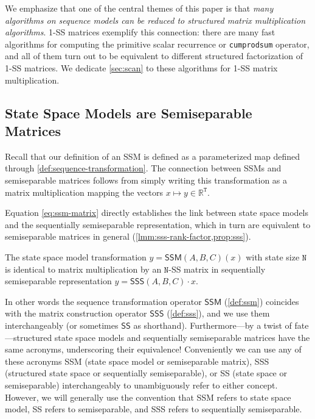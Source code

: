 We emphasize that one of the central themes of this paper is that \emph{many algorithms on sequence models can be reduced to structured matrix multiplication algorithms}. 1-SS matrices exemplify this connection: there are many fast algorithms for computing the primitive scalar recurrence or \texttt{cumprodsum} operator, and all of them turn out to be equivalent to different structured factorization of 1-SS matrices. We dedicate \ref{sec:scan} to these algorithms for 1-SS matrix multiplication.

\subsection{State Space Models are Semiseparable Matrices} Recall that our definition of an SSM is defined as a parameterized map defined through \ref{def:sequence-transformation}.
The connection between SSMs and semiseparable matrices follows from simply writing this transformation as a matrix multiplication mapping the vectors $x \mapsto y \in \mathbb{R}^\mathtt{T}$.

Equation \eqref{eq:ssm-matrix} directly establishes the link between state space models and the sequentially semiseparable representation, which in turn are equivalent to semiseparable matrices in general (\ref{lmm:sss-rank-factor,prop:sss}).

\begin{theorem}
  \label{thm:ssm-sss}
  The state space model transformation $y = \mathsf{SSM}(A, B, C)(x)$ with state size $\mathtt{N}$ is identical to matrix multiplication by an $\mathtt{N}$-SS matrix in sequentially semiseparable representation $y = \mathsf{SSS}(A, B, C) \cdot x$.
\end{theorem}

In other words the sequence transformation operator $\mathsf{SSM}$ (\ref{def:ssm}) coincides with the matrix construction operator $\mathsf{SSS}$ (\ref{def:sss}),
and we use them interchangeably (or sometimes $\mathsf{SS}$ as shorthand). Furthermore---by a twist of fate---structured state space models and sequentially semiseparable matrices have the same acronyms, underscoring their equivalence! Conveniently we can use any of these acronyms SSM (state space model or semiseparable matrix), SSS (structured state space or sequentially semiseparable), or SS (state space or semiseparable) interchangeably to unambiguously refer to either concept. However, we will generally use the convention that SSM refers to state space model, SS refers to semiseparable, and SSS refers to sequentially semiseparable.

